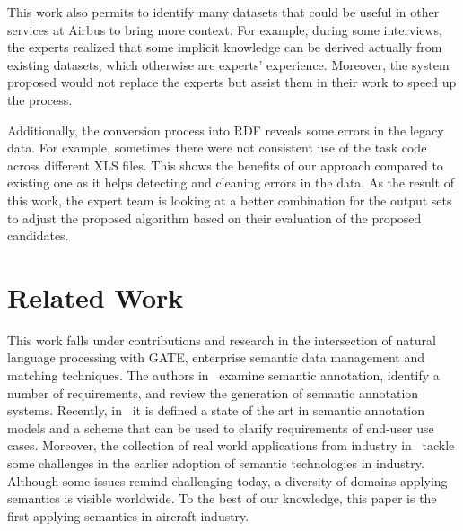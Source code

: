 \documentclass[a4paper,english,submission]{rnti}  %
\begin{document}
This work also permits to identify many datasets that could be useful in other services at Airbus to bring more context. For example, during some interviews, the experts realized that some implicit knowledge can be derived actually from existing datasets, which otherwise are experts' experience. Moreover, the system proposed would not replace the experts but assist them in their work to speed up the process.

Additionally, the conversion process into RDF reveals some errors in the legacy data. For example, sometimes there were not consistent use of the task code across different XLS files. This shows the benefits of our approach compared to existing one as it helps detecting and cleaning errors in the data.  As the result of this work, the expert team is looking at a better combination for the output sets to adjust the proposed algorithm based on their evaluation of the proposed candidates. 
  
\section{Related Work}
\label{sec:soa}

This work falls under contributions and research in the intersection of natural language processing with GATE, enterprise semantic data management and matching techniques. The authors in~\citep{Uren200614} examine semantic annotation, identify a number of requirements, and review the generation of semantic annotation systems. 
Recently, in~\citep{andrews2012} it is defined a state of the art in semantic annotation models and a scheme that can be used to clarify requirements of end-user use cases. Moreover, the collection of real world applications from industry in~\citep{cardoso2007} tackle some challenges in the earlier adoption of semantic technologies in industry. Although some issues remind challenging today, a diversity of domains applying semantics is visible worldwide. To the best of our knowledge, this paper is the first applying semantics in aircraft industry.  



\end{document}
